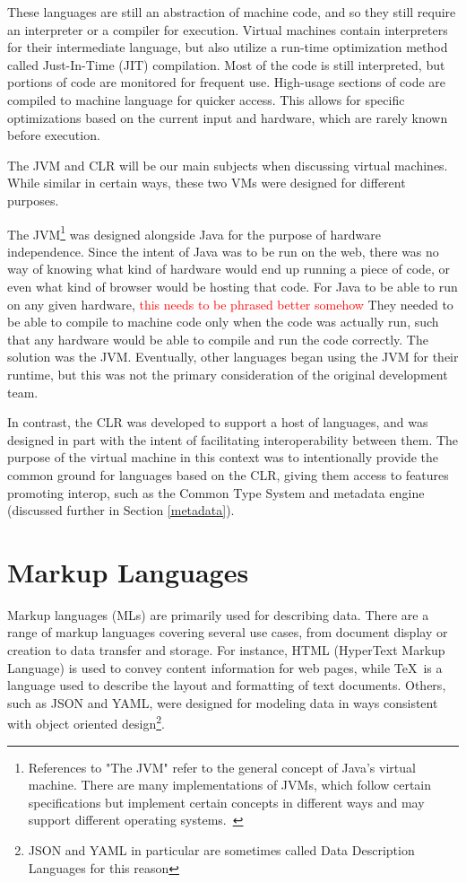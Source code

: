 \documentclass{sig-alternate}
\newcommand{\mycomment}[1]{\textcolor{red}{#1}}
\begin{document}
These languages are still an abstraction of machine code, and so they still require an interpreter or a compiler for execution.
Virtual machines contain interpreters for their intermediate language, but also utilize a run-time optimization method called Just-In-Time (JIT) compilation. Most of the code is still interpreted, but portions of code are monitored for frequent use. High-usage sections of code are compiled to machine language for quicker access. This allows for specific optimizations based on the current input and hardware, which are rarely known before execution.~\cite{wiki:JIT}



The JVM and CLR will be our main subjects when discussing virtual machines. While similar in certain ways, these two VMs were designed for different purposes.

The JVM\footnote{References to "The JVM" refer to the general concept of Java's virtual machine. There are many implementations of JVMs, which follow certain specifications but implement certain concepts in different ways and may support different operating systems.~\cite{wiki:multiJVM, wiki:JVM}}
was designed alongside Java for the purpose of hardware independence. Since the intent of Java was to be run on the web, there was no way of knowing what kind of hardware would end up running a piece of code, or even what kind of browser would be hosting that code.
For Java to be able to run on any given hardware, \mycomment{this needs to be phrased better somehow}
They needed to be able to compile to machine code only when the code was actually run, such that any hardware would be able to compile and run the code correctly. The solution was the JVM. Eventually, other languages began using the JVM for their runtime, but this was not the primary consideration of the original development team.

In contrast, the CLR was developed to support a host of languages, and was designed in part with the intent of facilitating interoperability between them. The purpose of the virtual machine in this context was to intentionally provide the common ground for languages based on the CLR, giving them access to features promoting interop, such as the Common Type System and metadata engine (discussed further in Section \ref{metadata}).


\section{Markup Languages}\label{ML}
Markup languages (MLs) are primarily used for describing data. There are a range of markup languages covering several use cases, from document display or creation to data transfer and storage. For instance, HTML (HyperText Markup Language) is used to convey content information for web pages, while \TeX~is a language used to describe the layout and formatting of text documents.
Others, such as JSON and YAML, were designed for modeling data in ways consistent with object oriented design\footnote{JSON and YAML in particular are sometimes called Data Description Languages for this reason}. 
\end{document}
